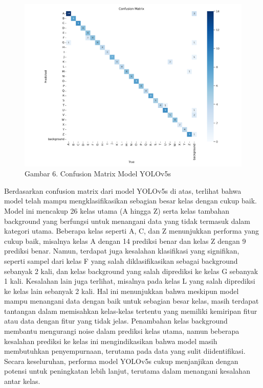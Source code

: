 \documentclass[12pt,a4paper]{article}
\begin{document}
\begin{figure}[h]
    \centering
    \includegraphics[width=0.6\linewidth]{Images/Gambar6Matrix.png}
    \caption*{Gambar 6. Confusion Matrix Model YOLOv5s}
    \label{fig:enter-label}
\end{figure}
\begin{adjustwidth}{6em}{0pt}
\hspace{0.5cm} Berdasarkan confusion matrix dari model YOLOv5s di atas, terlihat bahwa model telah mampu mengklasifikasikan sebagian besar kelas dengan cukup baik. Model ini mencakup 26 kelas utama (A hingga Z) serta kelas tambahan background yang berfungsi untuk menangani data yang tidak termasuk dalam kategori utama. Beberapa kelas seperti A, C, dan Z menunjukkan performa yang cukup baik, misalnya kelas A dengan 14 prediksi benar dan kelas Z dengan 9 prediksi benar. Namun, terdapat juga kesalahan klasifikasi yang signifikan, seperti sampel dari kelas F yang salah diklasifikasikan sebagai background sebanyak 2 kali, dan kelas background yang salah diprediksi ke kelas G sebanyak 1 kali. Kesalahan lain juga terlihat, misalnya pada kelas L yang salah diprediksi ke kelas lain sebanyak 2 kali. Hal ini menunjukkan bahwa meskipun model mampu menangani data dengan baik untuk sebagian besar kelas, masih terdapat tantangan dalam memisahkan kelas-kelas tertentu yang memiliki kemiripan fitur atau data dengan fitur yang tidak jelas. Penambahan kelas background membantu mengurangi noise dalam prediksi kelas utama, namun beberapa kesalahan prediksi ke kelas ini mengindikasikan bahwa model masih membutuhkan penyempurnaan, terutama pada data yang sulit diidentifikasi. Secara keseluruhan, performa model YOLOv5s cukup menjanjikan dengan potensi untuk peningkatan lebih lanjut, terutama dalam menangani kesalahan antar kelas.
\end{adjustwidth}
\end{document}
